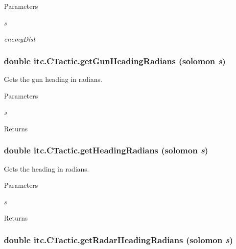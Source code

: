\begin{DoxyParams}{Parameters}
\item[{\em s}]\item[{\em enemyDist}]\end{DoxyParams}
\hypertarget{classitc_1_1_c_tactic_a3218f6ba011510c64b12d87bed7adfcb}{
\subsubsection[{getGunHeadingRadians}]{\setlength{\rightskip}{0pt plus 5cm}double itc.CTactic.getGunHeadingRadians ({\bf solomon} {\em s})}}
\label{classitc_1_1_c_tactic_a3218f6ba011510c64b12d87bed7adfcb}
Gets the gun heading in radians. 
\begin{DoxyParams}{Parameters}
\item[{\em s}]\end{DoxyParams}
\begin{DoxyReturn}{Returns}

\end{DoxyReturn}
\hypertarget{classitc_1_1_c_tactic_a8f926b64924184c4dab8a3c5efa5d410}{
\subsubsection[{getHeadingRadians}]{\setlength{\rightskip}{0pt plus 5cm}double itc.CTactic.getHeadingRadians ({\bf solomon} {\em s})}}
\label{classitc_1_1_c_tactic_a8f926b64924184c4dab8a3c5efa5d410}
Gets the heading in radians. 
\begin{DoxyParams}{Parameters}
\item[{\em s}]\end{DoxyParams}
\begin{DoxyReturn}{Returns}

\end{DoxyReturn}
\hypertarget{classitc_1_1_c_tactic_a4d8a555f548ee605c6d67de1e262b455}{
\subsubsection[{getRadarHeadingRadians}]{\setlength{\rightskip}{0pt plus 5cm}double itc.CTactic.getRadarHeadingRadians ({\bf solomon} {\em s})}}
